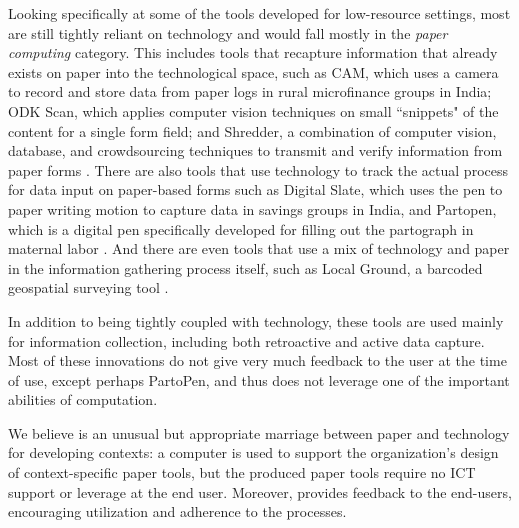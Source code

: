 \documentclass{sig-alternate}
\begin{document}
Looking specifically at some of the tools developed for low-resource settings, most are still tightly reliant on technology and would fall mostly in the \emph{paper computing} category. This includes tools that recapture information that already exists on paper into the technological space, such as CAM, which uses a camera to record and store data from paper logs in rural microfinance groups in India; ODK Scan, which applies computer vision techniques on small ``snippets" of the content for a single form field; and Shredder, a combination of computer vision, database, and crowdsourcing techniques to transmit and verify information from paper forms \cite{parikh2006, akona2009, dell2012, dell2013, chen2012}. There are also tools that use technology to track the actual process for data input on paper-based forms such as Digital Slate, which uses the pen to paper writing motion to capture data in savings groups in India, and Partopen, which is a digital pen specifically developed for filling out the partograph in maternal labor \cite{ratan2010, underwood2012, underwood2013}. And there are even tools that use a mix of technology and paper in the information gathering process itself, such as Local Ground, a barcoded geospatial surveying tool \cite{wart2010}.

In addition to being tightly coupled with technology, these tools are used mainly for information collection, including both retroactive and active data capture. Most of these innovations do not give very much feedback to the user at the time of use, except perhaps PartoPen, and thus does not leverage one of the important abilities of computation.

We believe \nifty is an unusual but appropriate marriage between paper and technology for developing contexts: a computer is used to support the organization's design of context-specific paper tools, but the produced paper tools require no ICT support or leverage at the end user. Moreover, \nifty provides feedback to the end-users, encouraging utilization and adherence to the processes.

\end{document}
